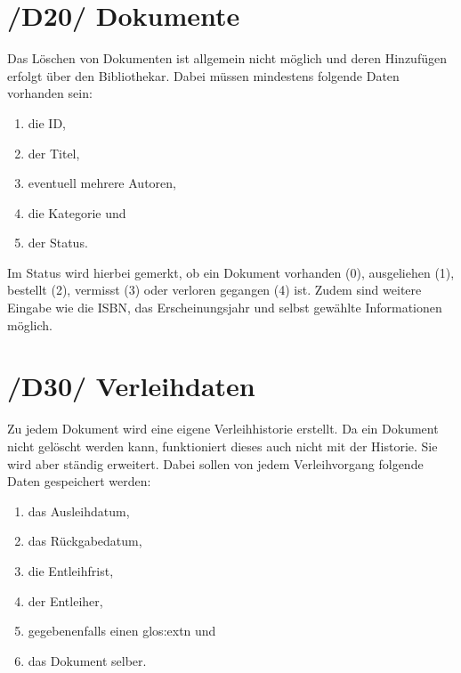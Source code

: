 \section{/D20/ Dokumente}
Das Löschen von Dokumenten ist allgemein nicht möglich und deren Hinzufügen erfolgt über den Bibliothekar. Dabei müssen mindestens folgende Daten vorhanden sein:
\begin{enumerate}
	\item die ID,
	\item der Titel,
	\item eventuell mehrere Autoren,
	\item die Kategorie und
	\item der Status.
\end{enumerate}
Im Status wird hierbei gemerkt, ob ein Dokument vorhanden (0), ausgeliehen (1), bestellt (2), vermisst (3) oder verloren gegangen (4) ist. 
Zudem sind weitere Eingabe wie die ISBN, das Erscheinungsjahr und selbst gewählte Informationen möglich. 

\section{/D30/ Verleihdaten}
Zu jedem Dokument wird eine eigene Verleihhistorie erstellt. Da ein Dokument nicht gelöscht werden kann, funktioniert dieses auch nicht mit der Historie. Sie wird aber ständig erweitert. Dabei sollen von jedem Verleihvorgang folgende Daten gespeichert werden:
\begin{enumerate}
	\item das Ausleihdatum,
	\item das Rückgabedatum,
	\item die Entleihfrist,
	\item der Entleiher,
	\item gegebenenfalls einen \gls{glos:ext}n und
	\item das Dokument selber.
\end{enumerate} 
